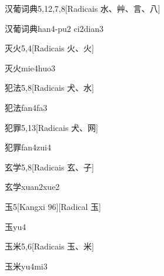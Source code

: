 \begin{entry}{汉葡词典}{5,12,7,8}[Radicais ⽔、⾋、⾔、⼋]
  \begin{phonetics}{汉葡词典}{han4-pu2 ci2dian3}
  \end{phonetics}
\end{entry}

\begin{entry}{灭火}{5,4}[Radicais ⽕、⽕]
  \begin{phonetics}{灭火}{mie4huo3}
  \end{phonetics}
\end{entry}

\begin{entry}{犯法}{5,8}[Radicais ⽝、⽔]
  \begin{phonetics}{犯法}{fan4fa3}
  \end{phonetics}
\end{entry}

\begin{entry}{犯罪}{5,13}[Radicais ⽝、⽹]
  \begin{phonetics}{犯罪}{fan4zui4}
  \end{phonetics}
\end{entry}

\begin{entry}{玄学}{5,8}[Radicais ⽞、⼦]
  \begin{phonetics}{玄学}{xuan2xue2}
  \end{phonetics}
\end{entry}

\begin{entry}{玉}{5}[Kangxi 96][Radical ⽟]
  \begin{phonetics}{玉}{yu4}
  \end{phonetics}
\end{entry}

\begin{entry}{玉米}{5,6}[Radicais ⽟、⽶]
  \begin{phonetics}{玉米}{yu4mi3}
  \end{phonetics}
\end{entry}

